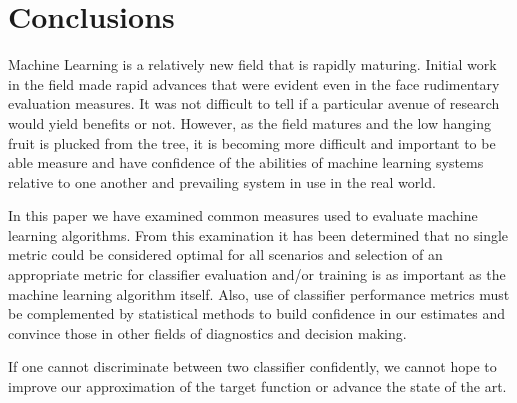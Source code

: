 \documentclass[10pt]{unbthesis}
\begin{document}
\section{Conclusions}
Machine Learning is a relatively new field that is rapidly
maturing. Initial work in the field made rapid advances that were
evident even in the face rudimentary evaluation measures. It was not
difficult to tell if a particular avenue of research would yield
benefits or not. However, as the field matures and the low hanging
fruit is plucked from the tree, it is becoming more difficult and
important to be able measure and have confidence of the abilities of
machine learning systems relative to one another and prevailing system
in use in the real world.

In this paper we have examined common measures used to evaluate
machine learning algorithms. From this examination it has been
determined that no single metric could be considered optimal for all
scenarios and selection of an appropriate metric for classifier
evaluation and/or training is as important as the machine learning
algorithm itself. Also, use of classifier performance metrics must be
complemented by statistical methods to build confidence in our
estimates and convince those in other fields of diagnostics and
decision making.

If one cannot discriminate between two classifier confidently, we
cannot hope to improve our approximation of the target function or
advance the state of the art.

\renewcommand{\bibname}{References}



\end{document}
